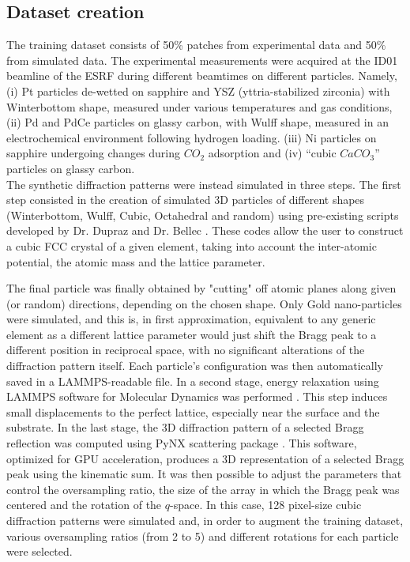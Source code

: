 \subsection{Dataset creation}\label{sec:dataset_creation3D}
The training dataset consists of 50\% patches from experimental data and 50\% from simulated data.
The experimental measurements were acquired at the ID01 beamline of the ESRF during different beamtimes on different particles.
Namely, (i) Pt particles de-wetted on sapphire and YSZ (yttria-stabilized zirconia) with Winterbottom shape, 
measured under various temperatures and gas conditions, (ii) Pd and PdCe particles on glassy carbon, with
Wulff shape, measured in an electrochemical environment following hydrogen loading. (iii) Ni particles on sapphire undergoing
changes during $CO_2$ adsorption and (iv) ``cubic $CaCO_3$'' particles on glassy carbon.
\\
The synthetic diffraction patterns were instead simulated in three steps. The first step consisted in the creation of 
simulated 3D particles of different shapes (Winterbottom, Wulff, Cubic, Octahedral and random) using pre-existing scripts
developed by Dr. Dupraz and Dr. Bellec \cite{lim_convolutional_2021}. These codes allow the user to construct a cubic FCC
crystal of a given element, taking into account the inter-atomic potential, the atomic mass
and the lattice parameter. 

The final particle was finally obtained by "cutting" off atomic planes along given (or random)
directions, depending on the chosen shape. Only Gold nano-particles were simulated, and this is, in first approximation,
equivalent to any generic element as a different lattice parameter would just shift the Bragg peak to a different 
position in reciprocal space, with no significant alterations of the diffraction pattern itself.  
Each particle's configuration was then automatically saved in a LAMMPS-readable file. In a second stage,
energy relaxation using LAMMPS software for Molecular Dynamics was performed \cite{LAMMPS2022}. This step induces small displacements 
to the perfect lattice, especially near the surface and the substrate. In the last stage, the 3D diffraction pattern of a selected Bragg 
reflection was computed using PyNX scattering package \cite{pynx_scattering}. This software, optimized for GPU 
acceleration, produces a 3D representation of a selected Bragg peak using the kinematic sum.
It was then possible to adjust the parameters that control the oversampling ratio, the size of the array in which the 
Bragg peak was centered and the rotation of the $q$-space. In this case, 128 pixel-size cubic diffraction 
patterns were simulated and, in order to augment the training dataset, various oversampling ratios (from 2 to 5) and 
different rotations for each particle were selected.

